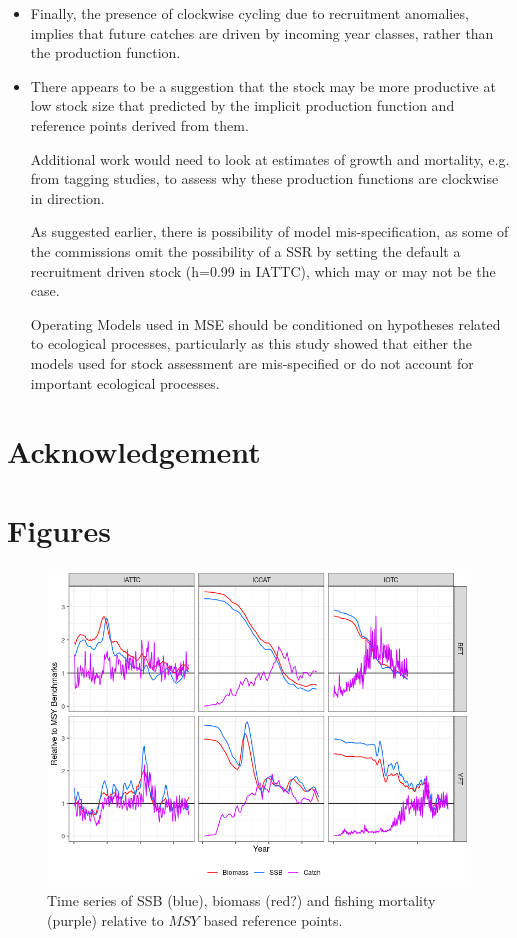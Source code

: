 \documentclass[12pt,doublespacing,a4paper]{ouparticle}
\begin{document}
\begin{itemize}[labelindent=\parindent,noitemsep,topsep=0pt,parsep=0pt,partopsep=0pt]
\item Finally, the presence of clockwise cycling due to recruitment anomalies, implies that future catches are driven by incoming year classes, rather than the production function.
\item There appears to be a suggestion that the stock may be more productive at low stock size that predicted by the implicit production function and reference points derived from them.

Additional work would need to look at estimates of growth and mortality, e.g. from tagging studies, to assess why these production functions are clockwise in direction.

As suggested earlier, there is possibility of model mis-specification, as some of the commissions omit the possibility of a SSR by setting the default a recruitment driven stock (h=0.99 in IATTC), which may or may not be the case.

Operating Models used in MSE should be conditioned on hypotheses related to ecological processes, particularly as this study showed that either the models used for stock assessment are mis-specified or do not account for important ecological processes.

\end{itemize}


\section{Acknowledgement}


\clearpage
%
%


\clearpage
\section{Figures}


\newpage
\begin{figure}[h]
\centering
\includegraphics[width=\textwidth]{pe-tsmsy-1.png}
\caption{Time series of SSB (blue), biomass (red?) and fishing mortality (purple) relative to $MSY$ based reference points.}
\label{fig:ts}
\end{figure}
\end{document}
